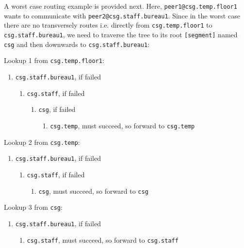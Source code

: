 \documentclass[times,10pt,twocolumn]{article}
\begin{document}
A worst case routing example is provided next. Here, \texttt{peer1@csg.temp.floor1}
wants to communicate with \texttt{peer2@csg.staff.bureau1}. Since in the worst
case there are no transversely routes i.e. directly from \texttt{csg.temp.floor1} to 
\texttt{csg.staff.bureau1}, we need to traverse the tree to its root \texttt{[segment]} 
named \texttt{csg} and then downwards to \texttt{csg.staff.bureau1}:\newline

Lookup 1 from \texttt{csg.temp.floor1}:
\begin{enumerate}
	\setlength{\itemsep}{-1mm}
	\item \texttt{csg.staff.bureau1}, if failed
	\begin{enumerate}
		\setlength{\itemsep}{-1mm}
		\item \texttt{csg.staff}, if failed
		\begin{enumerate}
			\setlength{\itemsep}{-1mm}
			\item \texttt{csg}, if failed
			\begin{enumerate}
				\setlength{\itemsep}{-1mm}
				\item \texttt{csg.temp}, must succeed, so forward to \texttt{csg.temp}
			\end{enumerate}
		\end{enumerate}
	\end{enumerate}
\end{enumerate}

Lookup 2 from \texttt{csg.temp}:
\begin{enumerate}
	\setlength{\itemsep}{-1mm}
	\item \texttt{csg.staff.bureau1}, if failed
	\begin{enumerate}
		\setlength{\itemsep}{-1mm}
		\item \texttt{csg.staff}, if failed
		\begin{enumerate}
			\setlength{\itemsep}{-1mm}
			\item \texttt{csg}, must succeed, so forward to \texttt{csg}
		\end{enumerate}
	\end{enumerate}
\end{enumerate}

Lookup 3 from \texttt{csg}:
\begin{enumerate}
	\setlength{\itemsep}{-1mm}
	\item \texttt{csg.staff.bureau1}, if failed
	\begin{enumerate}
		\setlength{\itemsep}{-1mm}
		\item \texttt{csg.staff}, must succeed, so forward to \texttt{csg.staff}
	\end{enumerate}
\end{enumerate}
\end{document}
